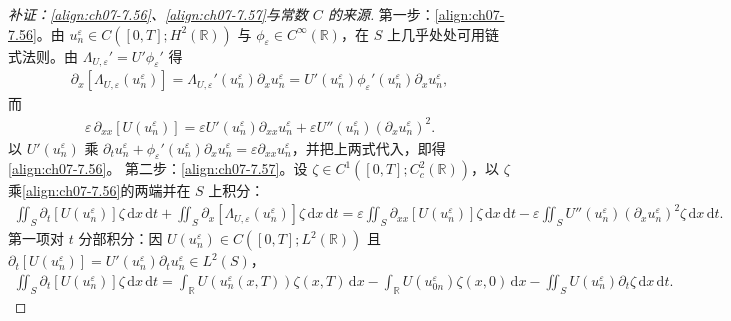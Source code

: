 ﻿\documentclass[../../main.tex]{subfiles}%
\begin{document}
\begin{proof}[补证：\eqref{align:ch07-7.56}、\eqref{align:ch07-7.57}与常数 $C$ 的来源]
第一步：\eqref{align:ch07-7.56}。由 $u_n^\varepsilon\in C([0,T];H^2(\mathbb{R}))$ 与 $\phi_\varepsilon\in C^\infty(\mathbb{R})$，在 $S$ 上几乎处处可用链式法则。由 $\Lambda_{U,\varepsilon}'=U'\phi_\varepsilon'$ 得
\begin{align*}
\partial_x[\Lambda_{U,\varepsilon}(u_n^\varepsilon)]=\Lambda_{U,\varepsilon}'(u_n^\varepsilon)\partial_xu_n^\varepsilon
=U'(u_n^\varepsilon)\phi_\varepsilon'(u_n^\varepsilon)\partial_xu_n^\varepsilon,
\end{align*}
而
\begin{align*}
\varepsilon\,\partial_{xx}[U(u_n^\varepsilon)]
=\varepsilon U'(u_n^\varepsilon)\partial_{xx}u_n^\varepsilon+\varepsilon U''(u_n^\varepsilon)(\partial_xu_n^\varepsilon)^2.
\end{align*}
以 $U'(u_n^\varepsilon)$ 乘 $\partial_tu_n^\varepsilon+\phi_\varepsilon'(u_n^\varepsilon)\partial_xu_n^\varepsilon=\varepsilon\partial_{xx}u_n^\varepsilon$，并把上两式代入，即得\eqref{align:ch07-7.56}。
第二步：\eqref{align:ch07-7.57}。设 $\zeta\in C^1([0,T];C^2_c(\mathbb{R}))$，以 $\zeta$ 乘\eqref{align:ch07-7.56}的两端并在 $S$ 上积分：
\begin{align*}
\iint_S\partial_t[U(u_n^\varepsilon)]\zeta\,\mathrm{d}x\,\mathrm{d}t
+\iint_S\partial_x[\Lambda_{U,\varepsilon}(u_n^\varepsilon)]\zeta\,\mathrm{d}x\,\mathrm{d}t
=\varepsilon\iint_S\partial_{xx}[U(u_n^\varepsilon)]\zeta\,\mathrm{d}x\,\mathrm{d}t
-\varepsilon\iint_SU''(u_n^\varepsilon)(\partial_xu_n^\varepsilon)^2\zeta\,\mathrm{d}x\,\mathrm{d}t.
\end{align*}
第一项对 $t$ 分部积分：因 $U(u_n^\varepsilon)\in C([0,T];L^2(\mathbb{R}))$ 且 $\partial_t[U(u_n^\varepsilon)]=U'(u_n^\varepsilon)\partial_tu_n^\varepsilon\in L^2(S)$，
\begin{align*}
\iint_S\partial_t[U(u_n^\varepsilon)]\zeta\,\mathrm{d}x\,\mathrm{d}t
=\int_{\mathbb{R}}U(u_n^\varepsilon(x,T))\zeta(x,T)\,\mathrm{d}x-\int_{\mathbb{R}}U(u_{0n}^\varepsilon)\zeta(x,0)\,\mathrm{d}x
-\iint_SU(u_n^\varepsilon)\partial_t\zeta\,\mathrm{d}x\,\mathrm{d}t.

\end{align*}
\end{proof}
\end{document}
